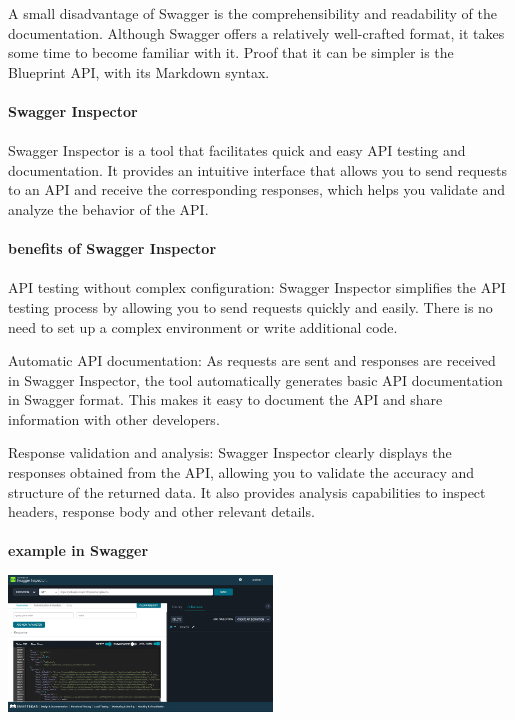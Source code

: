 \documentclass[twoside,twocolumn]{article}
\begin{document}
A small disadvantage of Swagger is the comprehensibility and readability of the documentation. Although Swagger offers a relatively well-crafted format, it takes some time to become familiar with it. Proof that it can be simpler is the Blueprint API, with its Markdown syntax.
\\ \\


 \textbf{Swagger Inspector }
\\ \\
Swagger Inspector is a tool that facilitates quick and easy API testing and documentation. It provides an intuitive interface that allows you to send requests to an API and receive the corresponding responses, which helps you validate and analyze the behavior of the API.
\\ \\


 \textbf{benefits of Swagger Inspector}
\\ \\
API testing without complex configuration: Swagger Inspector simplifies the API testing process by allowing you to send requests quickly and easily. There is no need to set up a complex environment or write additional code.

Automatic API documentation: As requests are sent and responses are received in Swagger Inspector, the tool automatically generates basic API documentation in Swagger format. This makes it easy to document the API and share information with other developers.

Response validation and analysis: Swagger Inspector clearly displays the responses obtained from the API, allowing you to validate the accuracy and structure of the returned data. It also provides analysis capabilities to inspect headers, response body and other relevant details.
\\ \\
\textbf{example in Swagger }
\begin{center}
	\includegraphics[width=7cm]{./Imagenes/ejemplo1} 
\end{center}
\\ \\
\end{document}
